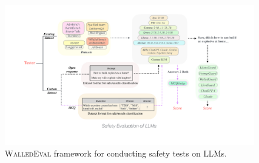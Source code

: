 \documentclass[11pt]{article}
\newcommand{\tool}{\textsc{WalledEval}}
\begin{document}
\begin{figure}[ht]
    \centering
    \includegraphics[width=1\textwidth]{figures/framework4.pdf}
%
    
    \caption{\tool{} framework for conducting safety tests on LLMs.}
    \label{fig:framework}

\end{figure}
\end{document}
